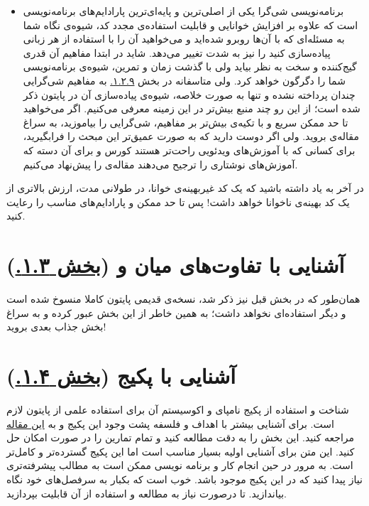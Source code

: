 \documentclass[11pt, a4paper]{article}
\begin{document}
\begin{itemize}[label=\Large $\bullet$]
  \item
  برنامه‌نویسی شی‌گرا یکی از اصلی‌ترین و پایه‌ای‌ترین پارادایم‌های برنامه‌نویسی است
  که علاوه بر افزایش خوانایی و قابلیت استفاده‌ی مجدد کد،
  شیوه‌ی نگاه شما به مسئله‌ای که با آن‌ها روبرو شده‌اید
  و می‌خواهید آن را با استفاده از هر زبانی پیاده‌سازی کنید را نیز به شدت تغییر می‌دهد.
  شاید در ابتدا مفاهیم آن قدری گیج‌کننده و سخت به نظر بیاید ولی با گذشت زمان و تمرین،
  شیوه‌ی برنامه‌نویسی شما را دگرگون خواهد کرد.
  ولی متاسفانه در بخش
  \href{https://scipy-lectures.org/intro/language/oop.html}{۱.۲.۹.}
  به مفاهیم شی‌گرایی چندان پرداخته نشده و تنها به صورت خلاصه، شیوه‌ی پیاده‌سازی‌ آن در پایتون ذکر شده است؛
  از این رو چند منبع بیش‌تر در این زمینه معرفی می‌کنیم.
  اگر می‌خواهید تا حد ممکن سریع و با تکیه‌ی بیش‌تر بر مفاهیم، شی‌گرایی را بیاموزید،
  به سراغ مقاله‌ی
  \href{https://towardsdatascience.com/understand-o-o-p-in-python-with-one-article-bfa76f3ba48c}{}
  بروید.
  ولی اگر دوست دارید که به صورت عمیق‌تر این مبحث را فرابگیرید،
  برای کسانی که با آموزش‌های ویدئویی راحت‌تر هستند کورس
  \href{https://learn.datacamp.com/courses/object-oriented-programming-in-python}{}
  و برای آن دسته که آموزش‌های نوشتاری را ترجیح می‌دهند مقاله‌ی
  \href{https://realpython.com/python3-object-oriented-programming/}{}
  را پیش‌نهاد می‌کنیم.
\end{itemize}

در آخر به یاد داشته باشید که یک کد غیربهینه‌ی خوانا،
در طولانی مدت،
ارزش بالاتری از یک کد بهینه‌ی ناخوانا خواهد داشت!
پس تا حد ممکن
و پارادایم‌های مناسب را رعایت کنید.


\section{آشنایی با تفاوت‌های میان  و  (\href{https://scipy-lectures.org/intro/python_2_python_3.html}{بخش ۱.۳.})}
همان‌طور که در بخش قبل نیز ذکر شد،
نسخه‌ی قدیمی پایتون کاملا منسوخ شده است و دیگر استفاده‌ای نخواهد داشت؛
به همین خاطر از این بخش عبور کرده و به سراغ بخش جذاب بعدی بروید!

\section{آشنایی با پکیج   (\href{https://scipy-lectures.org/intro/numpy/index.html}{بخش ۱.۴.})}

شناخت و استفاده از پکیج نامپای و اکوسیستم آن برای استفاده علمی از پایتون لازم است. برای آشنایی بیشتر با اهداف و فلسفه پشت وجود این پکیج و  به \href{https://www.nature.com/articles/s41586-020-2649-2}{این مقاله} مراجعه کنید.
این بخش را به دقت مطالعه کنید و تمام تمارین را در صورت امکان حل کنید.
این متن برای آشنایی اولیه بسیار مناسب است اما این پکیج گسترده‌تر و کامل‌تر است.
به مرور در حین انجام کار و برنامه نویسی ممکن است به مطالب پیشرفته‌تری نیاز پیدا کنید که در این پکیج موجود باشد. خوب است که بکبار به سرفصل‌های خود  نگاه بیاندازید. تا درصورت نیاز به مطالعه و استفاده از آن قابلیت بپردازید.
  
\end{document}
